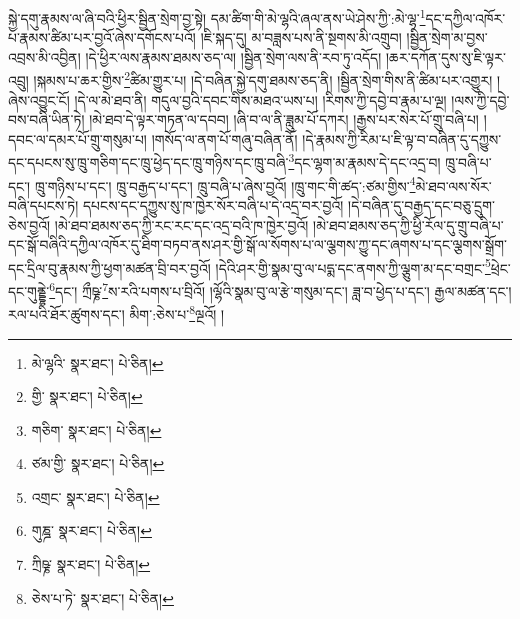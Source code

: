 སྐྱེ་དགུ་རྣམས་ལ་ཞི་བའི་ཕྱིར་སྦྱིན་སྲེག་བྱ་སྟེ། དམ་ཚིག་གི་མེ་ལྷའི་ཞལ་ནས་ཡེ་ཤེས་ཀྱི་:མེ་ལྷ་\footnote{མེ་ལྷའི་  སྣར་ཐང་།  པེ་ཅིན། }དང་དཀྱིལ་འཁོར་པ་རྣམས་ཚིམ་པར་བྱའོ་ཞེས་དགོངས་པའོ། །ཇི་སྐད་དུ། མ་བཟླས་པས་ནི་སྔགས་མི་འགྲུབ། །སྦྱིན་སྲེག་མ་བྱས་འབྲས་མི་འབྱིན། །དེ་ཕྱིར་ལས་རྣམས་ཐམས་ཅད་ལ། །སྦྱིན་སྲེག་ལས་ནི་རབ་ཏུ་འདོད། །ཆར་དཀོན་དུས་སུ་ཇི་ལྟར་འབྲུ། །སྐམས་པ་ཆར་གྱིས་\footnote{གྱི་  སྣར་ཐང་།  པེ་ཅིན། }ཚིམ་གྱུར་པ། །དེ་བཞིན་སྐྱེ་དགུ་ཐམས་ཅད་ནི། །སྦྱིན་སྲེག་གིས་ནི་ཚིམ་པར་འགྱུར། །ཞེས་འབྱུང་ངོ། །དེ་ལ་མེ་ཐབ་ནི། གདུལ་བྱའི་དབང་གིས་མཐའ་ཡས་པ། །རིགས་ཀྱི་དབྱེ་བ་རྣམ་པ་ལྔ། །ལས་ཀྱི་དབྱེ་བས་བཞི་ཡིན་ཏེ། །མེ་ཐབ་དེ་ལྟར་གཏན་ལ་དབབ། །ཞི་བ་ལ་ནི་ཟླུམ་པོ་དཀར། །རྒྱས་པར་སེར་པོ་གྲུ་བཞི་པ། །དབང་ལ་དམར་པོ་གྲུ་གསུམ་པ། །གསོད་ལ་ནག་པོ་གཞུ་བཞིན་ནོ། །དེ་རྣམས་ཀྱི་རིམ་པ་ཇི་ལྟ་བ་བཞིན་དུ་དཀྱུས་དང་དཔངས་སུ་ཁྲུ་གཅིག་དང་ཁྲུ་ཕྱེད་དང་ཁྲུ་གཉིས་དང་ཁྲུ་བཞི་\footnote{གཅིག་  སྣར་ཐང་།  པེ་ཅིན། }དང་ལྷག་མ་རྣམས་དེ་དང་འདྲ་བ། ཁྲུ་བཞི་པ་དང་། ཁྲུ་གཉིས་པ་དང་། ཁྲུ་བརྒྱད་པ་དང་། ཁྲུ་བཞི་པ་ཞེས་བྱའོ། །ཁྲུ་གང་གི་ཚད་:ཙམ་གྱིས་\footnote{ཙམ་གྱི་  སྣར་ཐང་།  པེ་ཅིན། }མེ་ཐབ་ལས་སོར་བཞི་དཔངས་ཏེ། དཔངས་དང་དཀྱུས་སུ་ཁ་ཁྱེར་སོར་བཞི་པ་དེ་འདྲ་བར་བྱའོ། །དེ་བཞིན་དུ་བརྒྱད་དང་བཅུ་དྲུག་ཅེས་བྱའོ། །མེ་ཐབ་ཐམས་ཅད་ཀྱི་རང་རང་དང་འདྲ་བའི་ཁ་ཁྱེར་བྱའོ། །མེ་ཐབ་ཐམས་ཅད་ཀྱི་ཕྱི་རོལ་དུ་གྲུ་བཞི་པ་དང་སྒོ་བཞིའི་དཀྱིལ་འཁོར་དུ་ཐིག་བཏབ་ནས་ཤར་གྱི་སྒོ་ལ་སོགས་པ་ལ་ལྕགས་ཀྱུ་དང་ཞགས་པ་དང་ལྕགས་སྒྲོག་དང་དྲིལ་བུ་རྣམས་ཀྱི་ཕྱག་མཚན་བྲི་བར་བྱའོ། །དེའི་ཤར་གྱི་སྣམ་བུ་ལ་པདྨ་དང་ནགས་ཀྱི་ལྕུག་མ་དང་བགྲང་\footnote{འགྲང་  སྣར་ཐང་།  པེ་ཅིན། }ཕྲེང་དང་གུནྡྷེ་\footnote{གུཎྜ་  སྣར་ཐང་།  པེ་ཅིན། }དང་། ཀྲྀཥྞ་\footnote{ཀྲིཥྞ་  སྣར་ཐང་།  པེ་ཅིན། }ས་རའི་པགས་པ་བྲིའོ། །ལྷོའི་སྣམ་བུ་ལ་རྩེ་གསུམ་དང་། ཟླ་བ་ཕྱེད་པ་དང་། རྒྱལ་མཚན་དང་། རལ་པའི་ཐོར་ཚུགས་དང་། མིག་:ཅེས་པ་\footnote{ཅེས་པ་ཏེ་  སྣར་ཐང་།  པེ་ཅིན། }ལྔའོ། །
